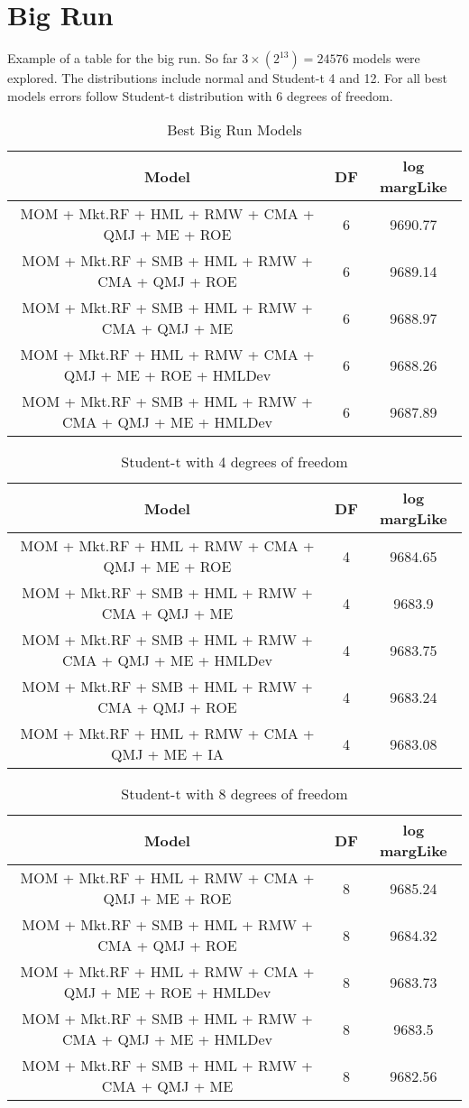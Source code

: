 \documentclass[12pt]{article}
\begin{document}
\section{Big Run}
Example of a table for the big run. So far $3\times(2^{13}) = 24576$ models were explored. The distributions include normal and Student-t 4 and 12. For all best models errors follow Student-t distribution with 6 degrees of freedom.
\begin{table}[ht]
	\centering
	\begin{tabular}{ccc}
		\hline
		Model & DF & log margLike \\ 
		\hline
		MOM + Mkt.RF + HML + RMW + CMA + QMJ + ME + ROE & 6 & 9690.77 \\ 
		MOM + Mkt.RF + SMB + HML + RMW + CMA + QMJ + ROE & 6 & 9689.14 \\ 
		MOM + Mkt.RF + SMB + HML + RMW + CMA + QMJ + ME & 6 & 9688.97 \\ 
		MOM + Mkt.RF + HML + RMW + CMA + QMJ + ME + ROE + HMLDev & 6 & 9688.26 \\ 
		MOM + Mkt.RF + SMB + HML + RMW + CMA + QMJ + ME + HMLDev & 6 & 9687.89 \\ 
		\hline
	\end{tabular}
	\caption{Best Big Run Models}
\end{table}
\begin{table}[ht]
	\centering
	\begin{tabular}{ccc}
		\hline
		Model & DF &  log margLike \\ 
		\hline
		MOM + Mkt.RF + HML + RMW + CMA + QMJ + ME + ROE & 4 & 9684.65 \\ 
		MOM + Mkt.RF + SMB + HML + RMW + CMA + QMJ + ME & 4 & 9683.9 \\ 
		MOM + Mkt.RF + SMB + HML + RMW + CMA + QMJ + ME + HMLDev & 4 & 9683.75 \\ 
		MOM + Mkt.RF + SMB + HML + RMW + CMA + QMJ + ROE & 4 & 9683.24 \\ 
		MOM + Mkt.RF + HML + RMW + CMA + QMJ + ME + IA & 4 & 9683.08 \\ 
		\hline
	\end{tabular}
	\caption{Student-t with 4 degrees of freedom}
\end{table}


\begin{table}[ht]
	\centering
	\begin{tabular}{ccc}
		\hline
		Model & DF & log margLike \\ 
		\hline
		MOM + Mkt.RF + HML + RMW + CMA + QMJ + ME + ROE & 8 & 9685.24 \\ 
		MOM + Mkt.RF + SMB + HML + RMW + CMA + QMJ + ROE & 8 & 9684.32 \\ 
		MOM + Mkt.RF + HML + RMW + CMA + QMJ + ME + ROE + HMLDev & 8 & 9683.73 \\ 
		MOM + Mkt.RF + SMB + HML + RMW + CMA + QMJ + ME + HMLDev & 8 & 9683.5 \\ 
		MOM + Mkt.RF + SMB + HML + RMW + CMA + QMJ + ME & 8 & 9682.56 \\ 
		\hline
	\end{tabular}
	\caption{Student-t with 8 degrees of freedom}
\end{table}
\end{document}
